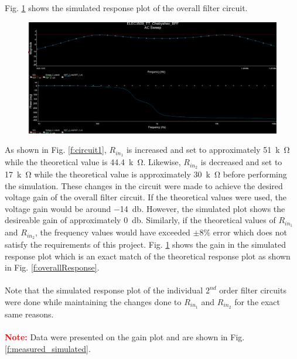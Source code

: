 \documentclass[hidelinks]{article}
\begin{document}
	\pagebreak
	\noindent Fig. \ref{f:overall_working} shows the simulated response plot of the overall filter circuit.
	\begin{figure}[htbp]
		\centering
		\includegraphics[width=0.7\textheight]{overall_working.png}
		\label{f:overall_working}
	\end{figure}

	\noindent As shown in Fig. \ref{f:circuit1}, $R_{in_1}$ is increased and set to approximately \SI{51}{k\ohm} while the theoretical value is \SI{44.4}{k\ohm}. 
	Likewise, $R_{in_2}$ is decreased and set to \SI{17}{k\ohm} while the theoretical value is approximately \SI{30}{k\ohm} before performing the simulation.
	These changes in the circuit were made to achieve the desired voltage gain of the overall filter circuit.
	If the theoretical values were used, the voltage gain would be around \SI{-14}{\decibel}. However, the simulated plot shows the desireable gain of approximately \SI{0}{\decibel}.
	Similarly, if the theoretical values of $R_{in_1}$ and $R_{in_2}$, the frequency values would have exceeded $\pm$8\% error which does not satisfy the requirements of this project.
	Fig. \ref{f:overall_working} shows the gain in the simulated response plot which is an exact match of the theoretical response plot as shown in Fig. \ref{f:overallResponse}.\\\\
	Note that the simulated response plot of the individual $2^{nd}$ order filter circuits were done while maintaining the changes done to $R_{in_1}$ and $R_{in_2}$ for the exact same reasons.\\\\
	\textcolor{red}{\textbf{Note:}} Data were presented on the gain plot and are shown in Fig. \ref{f:measured_simulated}.
	
\end{document}
